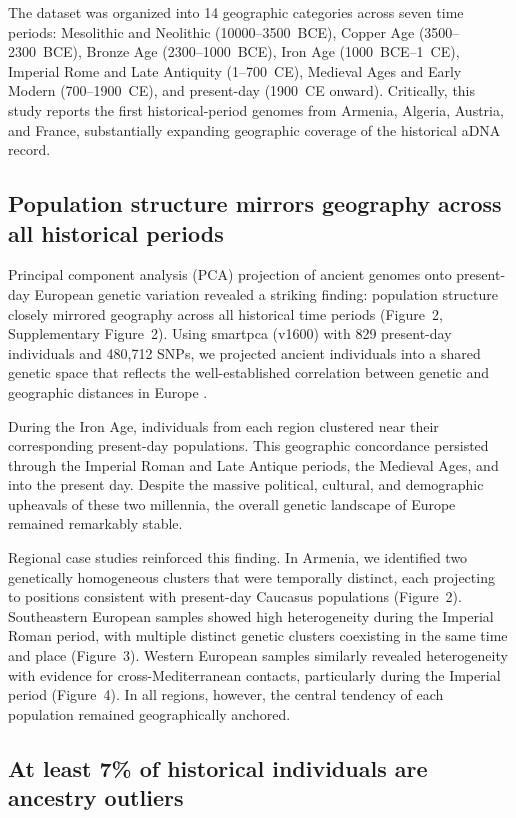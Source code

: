 \documentclass[11pt]{article}
\begin{document}
The dataset was organized into 14 geographic categories across seven time periods: Mesolithic and Neolithic (10000--3500~BCE), Copper Age (3500--2300~BCE), Bronze Age (2300--1000~BCE), Iron Age (1000~BCE--1~CE), Imperial Rome and Late Antiquity (1--700~CE), Medieval Ages and Early Modern (700--1900~CE), and present-day (1900~CE onward). Critically, this study reports the first historical-period genomes from Armenia, Algeria, Austria, and France, substantially expanding geographic coverage of the historical aDNA record.

\subsection{Population structure mirrors geography across all historical periods}

Principal component analysis (PCA) projection of ancient genomes onto present-day European genetic variation revealed a striking finding: population structure closely mirrored geography across all historical time periods (Figure~2, Supplementary Figure~2). Using smartpca (v1600) with 829 present-day individuals and 480,712 SNPs, we projected ancient individuals into a shared genetic space that reflects the well-established correlation between genetic and geographic distances in Europe \citep{novembre2008genes}.

During the Iron Age, individuals from each region clustered near their corresponding present-day populations. This geographic concordance persisted through the Imperial Roman and Late Antique periods, the Medieval Ages, and into the present day. Despite the massive political, cultural, and demographic upheavals of these two millennia, the overall genetic landscape of Europe remained remarkably stable.

Regional case studies reinforced this finding. In Armenia, we identified two genetically homogeneous clusters that were temporally distinct, each projecting to positions consistent with present-day Caucasus populations (Figure~2). Southeastern European samples showed high heterogeneity during the Imperial Roman period, with multiple distinct genetic clusters coexisting in the same time and place (Figure~3). Western European samples similarly revealed heterogeneity with evidence for cross-Mediterranean contacts, particularly during the Imperial period (Figure~4). In all regions, however, the central tendency of each population remained geographically anchored.

\subsection{At least 7\% of historical individuals are ancestry outliers}
\end{document}
